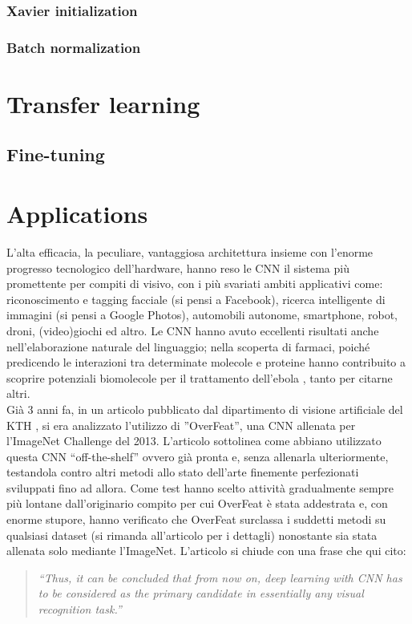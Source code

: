 \subsubsection{Xavier initialization}

\subsubsection{Batch normalization}


\section{Transfer learning}

\subsection{Fine-tuning}


\section{Applications}
L'alta efficacia, la peculiare, vantaggiosa architettura insieme con l'enorme progresso tecnologico dell'hardware, hanno reso le CNN il sistema più promettente per compiti di visivo, con i più svariati ambiti applicativi come: riconoscimento e tagging facciale (si pensi a Facebook), ricerca intelligente di immagini (si pensi a Google Photos), automobili autonome, smartphone, robot, droni, (video)giochi ed altro. Le CNN hanno avuto eccellenti risultati anche nell'elaborazione naturale del linguaggio; nella scoperta di farmaci, poiché predicendo le interazioni tra determinate molecole e proteine hanno contribuito a scoprire potenziali biomolecole per il trattamento dell'ebola \parencite{WCNN}, tanto per citarne altri.\\
Già 3 anni fa, in un articolo pubblicato dal dipartimento di visione artificiale del KTH \parencite{Overfeat}, si era analizzato l'utilizzo di ”OverFeat”, una CNN allenata per l'ImageNet Challenge del 2013. L'articolo sottolinea come abbiano utilizzato questa CNN “off-the-shelf” ovvero già pronta e, senza allenarla ulteriormente, testandola contro altri metodi allo stato dell'arte finemente perfezionati sviluppati fino ad allora. Come test hanno scelto attività gradualmente sempre più lontane dall'originario compito per cui OverFeat è stata addestrata e, con enorme stupore, hanno verificato che OverFeat surclassa i suddetti metodi su qualsiasi dataset (si rimanda all'articolo per i dettagli) nonostante sia stata allenata solo mediante l'ImageNet. L'articolo si chiude con una frase che qui cito:
\begin{quote}
\emph{“Thus, it can be concluded that from now on, deep learning with CNN has to be considered as the primary candidate in essentially any visual recognition task.”}
\end{quote}\\
